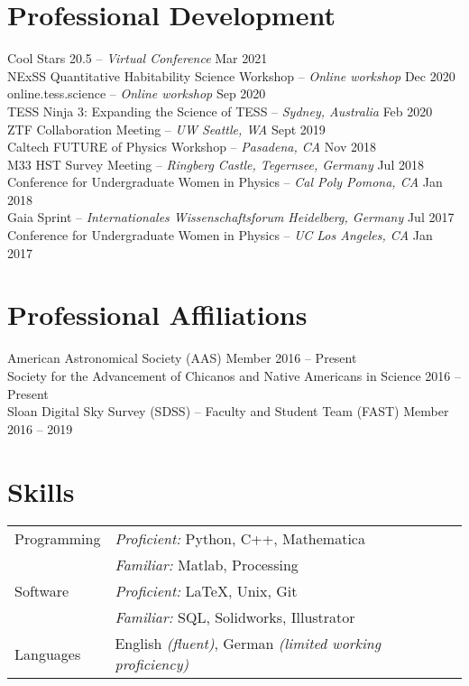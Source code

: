 \documentclass[margin,line]{resume}
\begin{document}
\begin{resume}
\section{\mysidestyle \textcolor{bcolor}{Professional Development}}
Cool Stars 20.5 -- \textit{Virtual Conference} \hfill Mar 2021 \\
NExSS Quantitative Habitability Science Workshop -- \textit{Online workshop} \hfill Dec 2020 \\
online.tess.science -- \textit{Online workshop} \hfill Sep 2020 \\
TESS Ninja 3: Expanding the Science of TESS -- \textit{Sydney, Australia} \hfill Feb 2020 \\
\newpage
ZTF Collaboration Meeting -- \textit{UW Seattle, WA} \hfill Sept 2019 \\
Caltech FUTURE of Physics Workshop -- \textit{Pasadena, CA} \hfill Nov 2018 \\
M33 HST Survey Meeting -- \textit{Ringberg Castle, Tegernsee, Germany} \hfill Jul 2018 \\
Conference for Undergraduate Women in Physics -- \textit{Cal Poly Pomona, CA}  \hfill Jan 2018 \\
Gaia Sprint -- \textit{Internationales Wissenschaftsforum Heidelberg, Germany}  \hfill Jul 2017 \\
Conference for Undergraduate Women in Physics -- \textit{UC Los Angeles, CA}  \hfill Jan 2017 



\section{\mysidestyle \textcolor{bcolor}{Professional Affiliations}}
American Astronomical Society (AAS) Member \hfill 2016 -- Present \\
Society for the Advancement of Chicanos and Native Americans in Science \hfill 2016 -- Present \\
Sloan Digital Sky Survey (SDSS) -- Faculty and Student Team (FAST) Member \hfill 2016 -- 2019 


\section{\mysidestyle \textcolor{bcolor}{Skills}} 

\noindent\begin{tabular}{@{}l|l}
  \multirow{1}{*}{{\sc Programming}} & \textit{Proficient:} Python, C++, Mathematica \\
    & \textit{Familiar:} Matlab, Processing \vspace{.1cm} \\
  \multirow{1}{*}{{\sc Software}} & \textit{Proficient:} \LaTeX, Unix, Git \\
    & \textit{Familiar:} SQL, Solidworks, Illustrator  \vspace{.1cm} \\
  \multirow{1}{*}{{\sc Languages}} & English \textit{(fluent)}, German \textit{(limited working proficiency)}
\end{tabular}


\end{resume}
\end{document}
